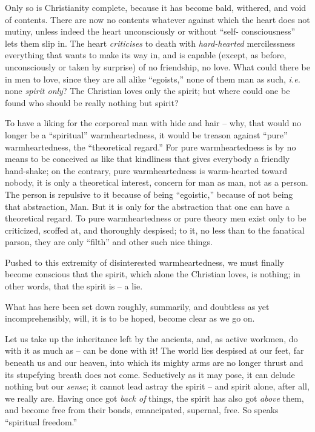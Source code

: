Only so is Christianity complete, because it has become bald, withered, and 
void of contents. There are now no contents whatever against which the heart 
does not mutiny, unless indeed the heart unconsciously or without ``self- 
consciousness'' lets them slip in. The heart \textit{criticises} to death 
with \textit{hard-hearted} mercilessness everything that wants to make its way 
in, and is capable (except, as before, unconsciously or taken by surprise) of 
no friendship, no love. What could there be in men to love, since they are all 
alike ``egoists,'' none of them man as such, \textit{i.e.} none 
\textit{spirit only}? The Christian loves only the spirit; but where could one 
be found who should be really nothing but spirit?

To have a liking for the corporeal man with hide and hair -- why, that would 
no longer be a ``spiritual'' warmheartedness, it would be treason against 
``pure'' warmheartedness, the ``theoretical regard.'' For pure 
warmheartedness is by no means to be conceived as like that kindliness that 
gives everybody a friendly hand-shake; on the contrary, pure warmheartedness 
is warm-hearted toward nobody, it is only a theoretical interest, concern for 
man as man, not as a person. The person is repulsive to it because of being 
``egoistic,'' because of not being that abstraction, Man. But it is only for 
the abstraction that one can have a theoretical regard. To pure 
warmheartedness or pure theory men exist only to be criticized, scoffed at, 
and thoroughly despised; to it, no less than to the fanatical parson, they are 
only ``filth'' and other such nice things.

Pushed to this extremity of disinterested warmheartedness, we must finally 
become conscious that the spirit, which alone the Christian loves, is nothing; 
in other words, that the spirit is -- a lie.

What has here been set down roughly, summarily, and doubtless as yet 
incomprehensibly, will, it is to be hoped, become clear as we go on.

Let us take up the inheritance left by the ancients, and, as active workmen, 
do with it as much as -- can be done with it! The world lies despised at our 
feet, far beneath us and our heaven, into which its mighty arms are no longer 
thrust and its stupefying breath does not come. Seductively as it may pose, it 
can delude nothing but our \textit{sense}; it cannot lead astray the spirit -- 
and spirit alone, after all, we really are. Having once got \textit{back of} 
things, the spirit has also got \textit{above} them, and become free from 
their bonds, emancipated, supernal, free. So speaks ``spiritual freedom.''

